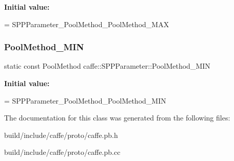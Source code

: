 {\bfseries Initial value\+:}
\begin{DoxyCode}
=
    SPPParameter\_PoolMethod\_PoolMethod\_MAX
\end{DoxyCode}
\mbox{\label{classcaffe_1_1_s_p_p_parameter_a5a2fbd0e6bb7dbe4ead8e1e1c089018b}} 
\subsubsection{\texorpdfstring{Pool\+Method\+\_\+\+M\+IN}{PoolMethod\_MIN}}
{\footnotesize\ttfamily static const Pool\+Method caffe\+::\+S\+P\+P\+Parameter\+::\+Pool\+Method\+\_\+\+M\+IN\hspace{0.3cm}{\ttfamily [static]}}

{\bfseries Initial value\+:}
\begin{DoxyCode}
=
    SPPParameter\_PoolMethod\_PoolMethod\_MIN
\end{DoxyCode}


The documentation for this class was generated from the following files\+:\begin{DoxyCompactItemize}
\item 
build/include/caffe/proto/caffe.\+pb.\+h\item 
build/include/caffe/proto/caffe.\+pb.\+cc\end{DoxyCompactItemize}
